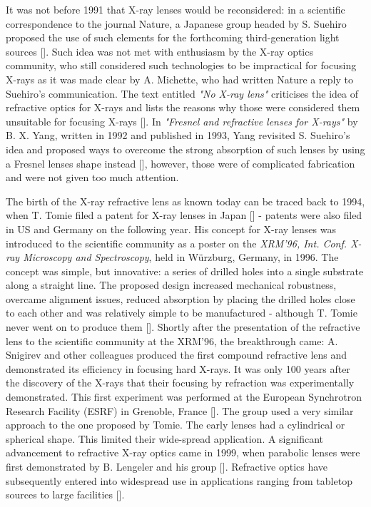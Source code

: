 \begin{refsection}
It was not before 1991 that X-ray lenses would be reconsidered: in a scientific correspondence to the journal Nature, a Japanese group headed by S. Suehiro proposed the use of such elements for the forthcoming third-generation light sources [\cite{Suehiro1991}]. Such idea was not met with enthusiasm by the X-ray optics community, who still considered such technologies to be impractical for focusing X-rays as it was made clear by A. Michette, who had written Nature a reply to Suehiro's communication. The text entitled \textit{"No X-ray lens"} criticises the idea of refractive optics for X-rays and lists the reasons why those were considered them unsuitable for focusing X-rays [\cite{Michette1991}]. In \textit{"Fresnel and refractive lenses for X-rays"} by B. X. Yang, written in 1992 and published in 1993, Yang revisited S. Suehiro's idea and proposed ways to overcome the strong absorption of such lenses by using a Fresnel lenses shape instead [\cite{Yang1993}], however, those were of complicated fabrication and were not given too much attention. 

The birth of the X-ray refractive lens as known today can be traced back to 1994, when T. Tomie filed a patent for X-ray lenses in Japan [\cite{Tomie1994}] - patents were also filed in US and Germany on the following year. His concept for X-ray lenses was introduced to the scientific community as a poster on the \textit{XRM'96, Int. Conf. X-ray Microscopy and Spectroscopy}, held in W\"urzburg, Germany, in 1996. The concept was simple, but innovative: a series of drilled holes into a single substrate along a straight line. The proposed design increased mechanical robustness, overcame alignment issues, reduced absorption by placing the drilled holes close to each other and was relatively simple to be manufactured - although T. Tomie never went on to produce them [\cite{Tomie2010}]. Shortly after the presentation of the refractive lens to the scientific community at the XRM'96, the breakthrough came: A. Snigirev and other colleagues produced the first compound refractive lens and demonstrated its efficiency in focusing hard X-rays. It was only 100 years after the discovery of the X-rays that their focusing by refraction was experimentally demonstrated. This first experiment was performed at the European Synchrotron Research Facility (ESRF) in  Grenoble, France [\cite{Snigirev1996}]. The group used a very similar approach to the one proposed by Tomie. The early lenses had a cylindrical or spherical shape. This limited their wide-spread application. A significant advancement to refractive X-ray optics came in 1999, when parabolic lenses were first demonstrated by B. Lengeler and his group [\cite{Lengeler1999,Lengeler2001}]. Refractive optics have subsequently entered into widespread use in applications ranging from tabletop sources to large facilities [\cite{Snigirev2008}].


\end{refsection}
